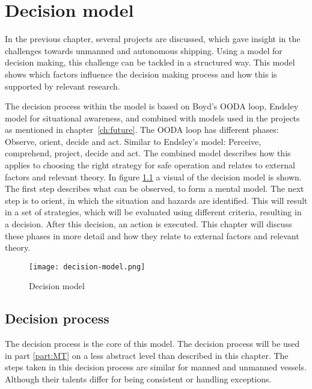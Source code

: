 \chapter{Decision model}
\label{ch:model}
In the previous chapter, several projects are discussed, which gave insight in the challenges towards unmanned and autonomous shipping. Using a model for decision making, this challenge can be tackled in a structured way. This model shows which factors influence the decision making process and how this is supported by relevant research.

The decision process within the model is based on Boyd's OODA loop, Endsley model for situational awareness, and combined with models used in the projects as mentioned in chapter~\ref{ch:future}. 
The OODA loop has different phases: Observe, orient, decide and act. Similar to Endsley's model: Perceive, comprehend, project, decide and act. 
The combined model describes how this applies to choosing the right strategy for safe operation and relates to external factors and relevant theory. In figure \ref{fig:decision-model} a visual of the decision model is shown. The first step describes what can be observed, to form a mental model. The next step is to orient, in which the situation and hazards are identified. This will result in a set of strategies, which will be evaluated using different criteria, resulting in a decision. After this decision, an action is executed. This chapter will discuss these phases in more detail and how they relate to external factors and relevant theory.

\begin{figure}[hbp]
	\centering
	\texttt{[image: decision-model.png]}
	\caption{Decision model}
	\label{fig:decision-model}
\end{figure}

\section{Decision process}
The decision process is the core of this model. The decision process will be used in part \ref{part:MT} on a less abstract level than described in this chapter. The steps taken in this decision process are similar for manned and unmanned vessels. Although their talents differ for being consistent or handling exceptions.

